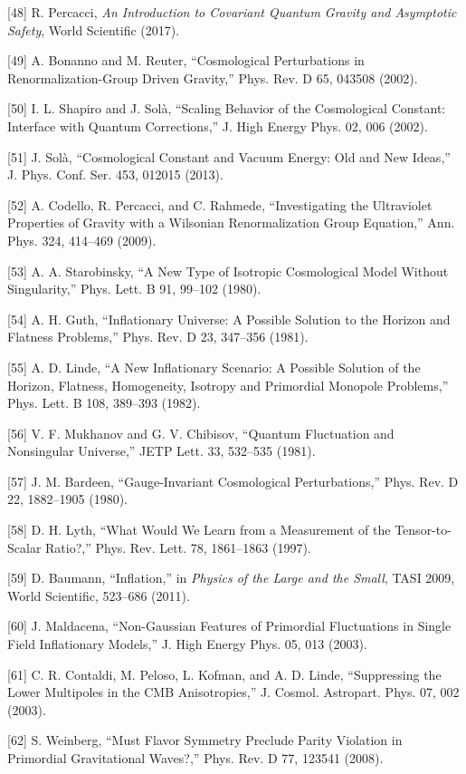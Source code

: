\documentclass[aps,prd,onecolumn,superscriptaddress,nofootinbib,longbibliography,10pt]{revtex4-2}
\begin{document}
  [48] R. Percacci, \textit{An Introduction to Covariant Quantum Gravity and Asymptotic Safety}, World Scientific (2017).


  [49] A. Bonanno and M. Reuter, “Cosmological Perturbations in Renormalization-Group Driven Gravity,” Phys. Rev. D 65, 043508 (2002).


  [50] I. L. Shapiro and J. Solà, “Scaling Behavior of the Cosmological Constant: Interface with Quantum Corrections,” J. High Energy Phys. 02, 006 (2002).


  [51] J. Solà, “Cosmological Constant and Vacuum Energy: Old and New Ideas,” J. Phys. Conf. Ser. 453, 012015 (2013).


  [52] A. Codello, R. Percacci, and C. Rahmede, “Investigating the Ultraviolet Properties of Gravity with a Wilsonian Renormalization Group Equation,” Ann. Phys. 324, 414–469 (2009).


  [53] A. A. Starobinsky, “A New Type of Isotropic Cosmological Model Without Singularity,” Phys. Lett. B 91, 99–102 (1980).


  [54] A. H. Guth, “Inflationary Universe: A Possible Solution to the Horizon and Flatness Problems,” Phys. Rev. D 23, 347–356 (1981).


  [55] A. D. Linde, “A New Inflationary Scenario: A Possible Solution of the Horizon, Flatness, Homogeneity, Isotropy and Primordial Monopole Problems,” Phys. Lett. B 108, 389–393 (1982).


  [56] V. F. Mukhanov and G. V. Chibisov, “Quantum Fluctuation and Nonsingular Universe,” JETP Lett. 33, 532–535 (1981).


  [57] J. M. Bardeen, “Gauge-Invariant Cosmological Perturbations,” Phys. Rev. D 22, 1882–1905 (1980).


  [58] D. H. Lyth, “What Would We Learn from a Measurement of the Tensor-to-Scalar Ratio?,” Phys. Rev. Lett. 78, 1861–1863 (1997).


  [59] D. Baumann, “Inflation,” in \textit{Physics of the Large and the Small}, TASI 2009, World Scientific, 523–686 (2011).


  [60] J. Maldacena, “Non-Gaussian Features of Primordial Fluctuations in Single Field Inflationary Models,” J. High Energy Phys. 05, 013 (2003).


  [61] C. R. Contaldi, M. Peloso, L. Kofman, and A. D. Linde, “Suppressing the Lower Multipoles in the CMB Anisotropies,” J. Cosmol. Astropart. Phys. 07, 002 (2003).


  [62] S. Weinberg, “Must Flavor Symmetry Preclude Parity Violation in Primordial Gravitational Waves?,” Phys. Rev. D 77, 123541 (2008).
\end{document}
